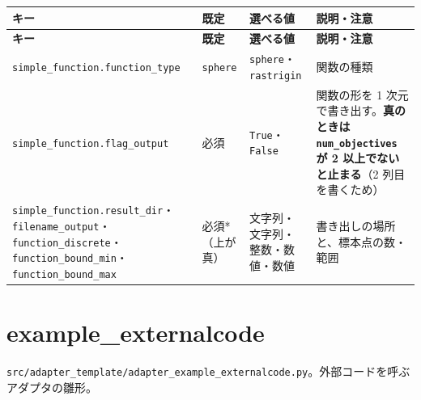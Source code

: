\begingroup\small
\begin{longtable}{>{\raggedright\arraybackslash}p{}>{\raggedright\arraybackslash}p{}>{\raggedright\arraybackslash}p{}>{\raggedright\arraybackslash}p{}}
\toprule
\textbf{キー} & \textbf{既定} & \textbf{選べる値} & \textbf{説明・注意} \\
\midrule
\endfirsthead
\toprule
\textbf{キー} & \textbf{既定} & \textbf{選べる値} & \textbf{説明・注意} \\
\midrule
\endhead
\bottomrule
\endlastfoot
\texttt{simple\_\allowbreak{}function.\allowbreak{}function\_\allowbreak{}type} & \texttt{sphere} & \texttt{sphere}・\texttt{rastrigin} & 関数の種類 \\
\texttt{simple\_\allowbreak{}function.\allowbreak{}flag\_\allowbreak{}output} & 必須 & \texttt{True}・\texttt{False} & 関数の形を 1 次元で書き出す。\textbf{真のときは \texttt{num\_\allowbreak{}objectives} が 2 以上でないと止まる}（2 列目を書くため） \\
\texttt{simple\_\allowbreak{}function.\allowbreak{}result\_\allowbreak{}dir}・\texttt{filename\_\allowbreak{}output}・\texttt{function\_\allowbreak{}discrete}・\texttt{function\_\allowbreak{}bound\_\allowbreak{}min}・\texttt{function\_\allowbreak{}bound\_\allowbreak{}max} & 必須*（上が真） & 文字列・文字列・整数・数値・数値 & 書き出しの場所と、標本点の数・範囲 \\
\end{longtable}
\endgroup

\section{example\_externalcode}

\texttt{src/\allowbreak{}adapter\_\allowbreak{}template/\allowbreak{}adapter\_\allowbreak{}example\_\allowbreak{}externalcode.\allowbreak{}py}。外部コードを呼ぶアダプタの雛形。

